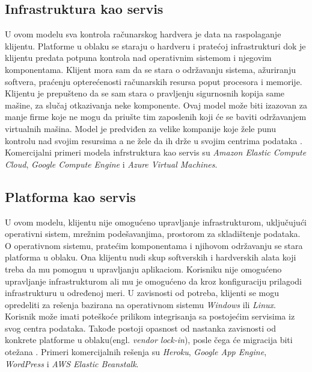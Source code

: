 \documentclass[12pt,oneside]{memoir}
\begin{document}
\subsection{Infrastruktura kao servis}

U ovom modelu sva kontrola računarskog hardvera je data na raspolaganje klijentu. Platforme u oblaku se staraju o hardveru i pratećoj infrastrukturi dok je klijentu predata potpuna kontrola nad operativnim sistemom i njegovim komponentama. Klijent mora sam da se stara o održavanju sistema, ažuriranju softvera, praćenju opterećenosti računarskih resursa poput procesora i memorije. Klijentu je prepušteno da se sam stara o pravljenju sigurnosnih kopija same mašine, za slučaj otkazivanja neke komponente. Ovaj model može biti izazovan za manje firme koje ne mogu da priušte tim zaposlenih koji će se baviti održavanjem virtualnih mašina. Model je predviđen za velike kompanije koje žele punu kontrolu nad svojim resursima a ne žele da ih drže u svojim centrima podataka \cite{cc}. Komercijalni primeri modela infrstruktura kao servis su \emph{Amazon Elastic Compute Cloud}, \emph{Google Compute Engine} i \emph{Azure Virtual Machines}. 

 
\subsection{Platforma kao servis}
U ovom modelu, klijentu nije omogućeno upravljanje infrastrukturom, uključujući operativni sistem, mrežnim podešavanjima, prostorom za skladištenje podataka. O operativnom sistemu, pratećim komponentama i njihovom održavanju se stara platforma u oblaku. Ona klijentu nudi skup softverskih i hardverskih alata koji treba da mu pomognu u upravljanju aplikaciom. Korisniku nije omogućeno upravljanje infrastrukturom ali mu je omogućeno da kroz konfiguraciju prilagodi infrastrukturu u određenoj meri. U zavisnosti od potreba, klijenti se mogu opredeliti za rešenja bazirana na operativnom sistemu \emph{Windows} ili \emph{Linux}. Korisnik može imati poteškoće prilikom integrisanja sa postojećim servisima iz svog centra podataka. Takođe postoji opasnost od nastanka zavisnosti od konkrete platforme u oblaku(engl. \emph{vendor lock-in}), posle čega će migracija biti otežana \cite{cc}. Primeri komercijalnih rešenja su \emph{Heroku}, \emph{Google App Engine}, \emph{WordPress} i \emph{AWS Elastic Beanstalk}. 
\end{document}
